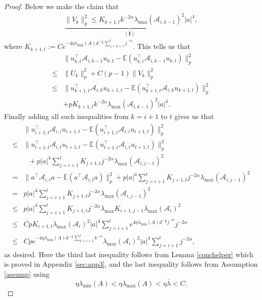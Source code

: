 \documentclass[11pt, reqno,english]{amsart}
\begin{document}
\begin{proof}
Below we make the claim that
\begin{align*}
    \underbrace{\|V_k\|^2_p \leq K_{k+1,t} k^{-2\alpha} \lambda_{\max}(\mathcal A_{i,k-1})^2|a|^4}_{(\mathbf{I})},
\end{align*}
where $K_{k+1,t} := Ce^{- 4\eta \lambda_{\min}(A)d^{-\frac{1}{2}}\sum_{j = k+1}^{t}j^{-\alpha}}$. This tells us that 
\begin{align*}
& \|u^\top_{k,t}\mathcal A_{i,k-1}u_{k,t} - \mathbb{E}(u^\top_{k,t}\mathcal A_{i,k-1}u_{k,t})\|^2_p \\
\leq & \|U_k\|^2_p + C(p-1)\|V_k\|^2_p 
\\
\leq & \|u^\top_{k+1,t}\mathcal A_{i,k}u_{k+1,t} - \mathbb{E}(u^\top_{k+1,t}\mathcal A_{i,k}u_{k+1,t})\|^2_p 
\\
&+ pK_{k+1,t}k^{-2\alpha}\lambda_{\max}(\mathcal A_{i,k-1})^2|a|^4.
\end{align*}
Finally adding all such inequalities from $k = i+1$ to $t$ gives us that
\begin{align*}
& \|u^\top_{i+1,t}\mathcal A_{i,i} u_{i+1,t} - \mathbb{E}(u^\top_{i+1,t} \mathcal A_{i,i} u_{i+1,t})\|^2_p \\
\leq & \|u^\top_{t+1,t}\mathcal A_{i,t} u_{t+1,t} - \mathbb{E}(u^\top_{t+1,t} \mathcal A_{i,t} u_{t+1,t})\|^2_p 
\\
 &~~~+ p|a|^4\sum_{j = i+1}^tK_{j+1,t}j^{-2\alpha}\lambda_{\max}(\mathcal A_{i,j-1})^2
\\
= & \|a^\top\mathcal A_{i,t} a - \mathbb{E}(a^\top\mathcal A_{i,t} a)\|^2_p + p|a|^4\sum_{j = i+1}^tK_{j+1,t}j^{-2\alpha}\lambda_{\max}(\mathcal A_{i,j-1})^2
\\
= & p|a|^4\sum_{j = i+1}^tK_{j+1,t}j^{-2\alpha}\lambda_{\max}(\mathcal A_{i,j-1})^2
\\
\leq  & p|a|^4\sum_{j = i+1}^tK_{j+1,t}j^{-2\alpha}\lambda_{\max}K_{i+1, j-1} \lambda_{\max}(\mathcal A_i)^2
\\
\leq & Cp K_{i+1,t} \lambda_{\max}(\mathcal A_i)^2|a|^4\sum_{j = i+1}^t e^{4\eta \lambda_{\min}(A)d^{-\frac{1}{2}}j^{-\alpha}}j^{-2\alpha}
\\
\leq & Cpe^{- 4\eta \lambda_{\min}(A)d^{-\frac{1}{2}}\sum_{k = i+1}^t k^{-\alpha}}\lambda_{\max}(\mathcal A_i)^2 |a|^4 \sum_{j = i+1}^t j^{-2\alpha},
\end{align*}
as desired. Here the third last inequality follows from Lemma \ref{conchelper} which is proved in Appendix \ref{sec:app3}, and the last inequality follows from Assumption \ref{assump} using $$\eta \lambda_{\min}(A) < \eta \lambda_{\max}(A) < \eta \bar{\lambda} < C.$$

\end{proof}
\end{document}
